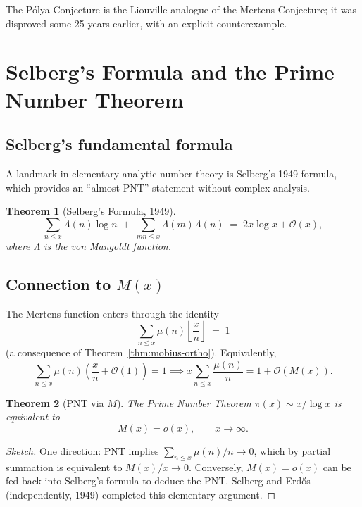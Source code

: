 \documentclass[12pt,a4paper]{amsart}
\newtheorem{theorem}{Theorem}[section]
\theoremstyle{definition}
\newcommand{\BigO}{\mathcal{O}}
\begin{document}
The Pólya Conjecture is the Liouville analogue of the Mertens Conjecture; it
was disproved some 25 years earlier, with an explicit counterexample.

\section{Selberg's Formula and the Prime Number Theorem}
\label{sec:selberg}

\subsection{Selberg's fundamental formula}

A landmark in elementary analytic number theory is Selberg's 1949 formula,
which provides an ``almost-PNT'' statement without complex analysis.

\begin{theorem}[Selberg's Formula, 1949]
\label{thm:selberg}
\[
  \sum_{n \le x} \Lambda(n)\log n
  \;+\; \sum_{mn \le x} \Lambda(m)\Lambda(n)
  \;=\; 2x\log x + \BigO(x),
\]
where $\Lambda$ is the von Mangoldt function.
\end{theorem}

\subsection{Connection to $M(x)$}

The Mertens function enters through the identity
\[
  \sum_{n \le x} \mu(n)\left\lfloor\frac{x}{n}\right\rfloor \;=\; 1
\]
(a consequence of Theorem~\ref{thm:mobius-ortho}).  Equivalently,
\[
  \sum_{n \le x}\mu(n)\left(\frac{x}{n} + \BigO(1)\right) = 1
  \implies x\sum_{n \le x}\frac{\mu(n)}{n} = 1 + \BigO(M(x)).
\]

\begin{theorem}[PNT via $M$]
\label{thm:pnt-mertens}
The Prime Number Theorem $\pi(x) \sim x/\log x$ is equivalent to
\[
  M(x) = o(x), \qquad x \to \infty.
\]
\end{theorem}

\begin{proof}[Sketch]
One direction: PNT implies $\sum_{n \le x}\mu(n)/n \to 0$, which by partial
summation is equivalent to $M(x)/x \to 0$.
Conversely, $M(x)=o(x)$ can be fed back into Selberg's formula to deduce the
PNT.  Selberg and Erd\H{o}s (independently, 1949) completed this elementary
argument.
\end{proof}
\end{document}
